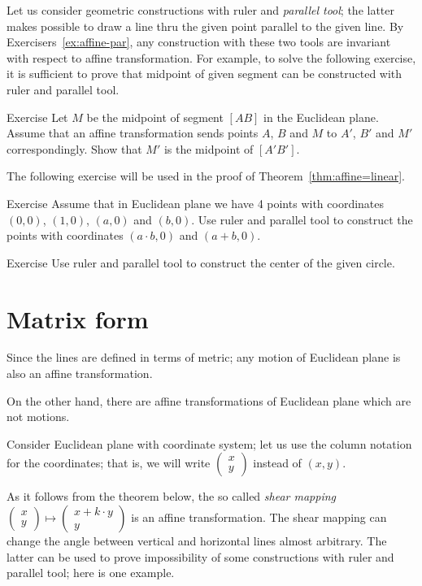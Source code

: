 Let us consider geometric constructions with ruler and \emph{parallel tool};
the latter makes possible to draw a line thru the given point parallel to the given line.
By Exercisers~\ref{ex:affine-par}, any construction with these two tools are invariant with respect to affine transformation.
For example, 
to solve the following exercise,
it is sufficient to prove that midpoint of given segment can be constructed with ruler and parallel tool.

\begin{thm}{Exercise}\label{ex:midpoint-affine}
Let $M$ be the midpoint of segment $[AB]$ in the Euclidean plane.
Assume that an affine transformation sends points $A$, $B$ and $M$
to $A'$, $B'$ and $M'$ correspondingly.
Show that $M'$ is the midpoint of $[A'B']$.
\end{thm}

The following exercise will be used in the proof of Theorem~\ref{thm:affine=linear}.

\begin{thm}{Exercise}\label{ex:R-hom}
Assume that in Euclidean plane we have 4 points with coordinates 
$(0,0)$, $(1,0)$, $(a,0)$ and $(b,0)$.
Use ruler and parallel tool to construct the points with coordinates $(a\cdot b,0)$ and $(a+b,0)$.
\end{thm}

\begin{thm}{Exercise}\label{ex:center-circ-affine}
Use ruler and parallel tool to construct the center of the given circle.
\end{thm}

\section*{Matrix form}

Since the lines are defined in terms of metric;
any motion of Euclidean plane is also an affine transformation.

On the other hand, 
there are affine transformations of Euclidean plane which are not motions.

Consider Euclidean plane with coordinate system;
let us use the column notation for the coordinates;
that is, we will write $\left(\begin{smallmatrix}
x\\y
\end{smallmatrix} \right)$ instead of $(x,y)$.

As it follows from the theorem below,
the so called {}\emph{shear mapping} $\left(\begin{smallmatrix}
x\\ y
\end{smallmatrix} \right)\mapsto \left(\begin{smallmatrix}
x+k\cdot y\\ y
\end{smallmatrix} \right)$ is an affine transformation.
The shear mapping can change the angle between vertical and horizontal lines almost arbitrary.
The latter can be used to prove impossibility of some constructions with ruler and parallel tool;
here is one example.

